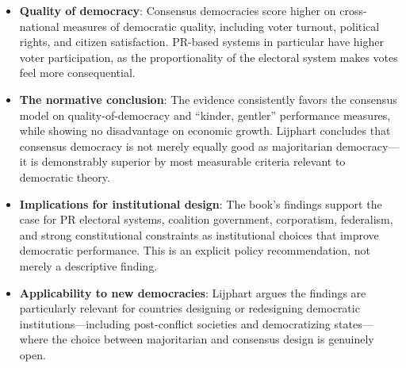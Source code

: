 \documentclass[12pt]{article}
\begin{document}
\begin{itemize}[leftmargin=*, itemsep=4pt]
    \item \textbf{Quality of democracy}: Consensus democracies score higher on cross-national measures of democratic quality, including voter turnout, political rights, and citizen satisfaction. PR-based systems in particular have higher voter participation, as the proportionality of the electoral system makes votes feel more consequential.
    \item \textbf{The normative conclusion}: The evidence consistently favors the consensus model on quality-of-democracy and ``kinder, gentler'' performance measures, while showing no disadvantage on economic growth. Lijphart concludes that consensus democracy is not merely equally good as majoritarian democracy---it is demonstrably superior by most measurable criteria relevant to democratic theory.
    \item \textbf{Implications for institutional design}: The book's findings support the case for PR electoral systems, coalition government, corporatism, federalism, and strong constitutional constraints as institutional choices that improve democratic performance. This is an explicit policy recommendation, not merely a descriptive finding.
    \item \textbf{Applicability to new democracies}: Lijphart argues the findings are particularly relevant for countries designing or redesigning democratic institutions---including post-conflict societies and democratizing states---where the choice between majoritarian and consensus design is genuinely open.
\end{itemize}
\end{document}
